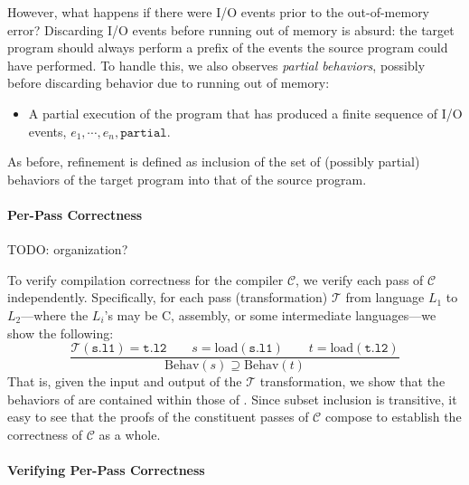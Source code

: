 However, what happens if there were I/O events prior to the out-of-memory error?  Discarding I/O
events before running out of memory is absurd: the target program should always perform a prefix of
the events the source program could have performed.  To handle this, we also observes \emph{partial
  behaviors}, possibly before discarding behavior due to running out of memory:


\begin{itemize}
\item A partial execution of the program that has produced a finite sequence
of I/O events, $e_1, \cdots, e_n, \mathtt{partial}$.
\end{itemize}
As before, refinement is defined as inclusion of the set of (possibly partial) behaviors of the
target program into that of the source program.


\paragraph{Per-Pass Correctness}

TODO: organization?

To verify compilation correctness for the compiler $\mathcal{C}$, we verify each pass of
$\mathcal{C}$ independently.  Specifically, for each pass (transformation) $\mathcal{T}$ from
language $L_1$ to $L_2$---where the $L_i$'s may be C, assembly, or some intermediate languages---we
show the following:
\[
\frac{
\mathcal{T}(\mathtt{s.l1}) = \mathtt{t.l2} \qquad
s = \mathrm{load}(\mathtt{s.l1}) \qquad
t = \mathrm{load}(\mathtt{t.l2})
}
{
\mathrm{Behav}(s) \supseteq \mathrm{Behav}(t)
}
\]
That is, given the input  and output  of the $\mathcal{T}$ transformation, we
show that the behaviors of  are contained within those of .  Since subset
inclusion is transitive, it easy to see that the proofs of the constituent passes of $\mathcal{C}$
compose to establish the correctness of $\mathcal{C}$ as a whole.


\paragraph{Verifying Per-Pass Correctness}

